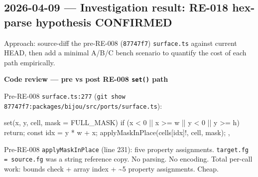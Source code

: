 \subsection{2026-04-09 --- Investigation result: RE-018 hex-parse hypothesis CONFIRMED}\label{record-422-investigation-result-re-018-hex-parse-hypothesis-confirmed}

Approach: source-diff the pre-RE-008 (\texttt{8\allowbreak{}7\allowbreak{}7\allowbreak{}4\allowbreak{}7\allowbreak{}f\allowbreak{}7}) \texttt{s\allowbreak{}u\allowbreak{}r\allowbreak{}f\allowbreak{}a\allowbreak{}c\allowbreak{}e\allowbreak{}.\allowbreak{}t\allowbreak{}s} against current HEAD, then add a minimal A/B/C bench scenario to quantify the cost of each path empirically.

\textbf{Code review --- pre vs post RE-008 \texttt{s\allowbreak{}e\allowbreak{}t\allowbreak{}(\allowbreak{})} path}

Pre-RE-008 \texttt{s\allowbreak{}u\allowbreak{}r\allowbreak{}f\allowbreak{}a\allowbreak{}c\allowbreak{}e\allowbreak{}.\allowbreak{}t\allowbreak{}s\allowbreak{}:\allowbreak{}2\allowbreak{}7\allowbreak{}7} (\texttt{g\allowbreak{}i\allowbreak{}t\allowbreak{} \allowbreak{}s\allowbreak{}h\allowbreak{}o\allowbreak{}w\allowbreak{} \allowbreak{}8\allowbreak{}7\allowbreak{}7\allowbreak{}4\allowbreak{}7\allowbreak{}f\allowbreak{}7\allowbreak{}:\allowbreak{}p\allowbreak{}a\allowbreak{}c\allowbreak{}k\allowbreak{}a\allowbreak{}g\allowbreak{}e\allowbreak{}s\allowbreak{}/\allowbreak{}b\allowbreak{}i\allowbreak{}j\allowbreak{}o\allowbreak{}u\allowbreak{}/\allowbreak{}s\allowbreak{}r\allowbreak{}c\allowbreak{}/\allowbreak{}p\allowbreak{}o\allowbreak{}r\allowbreak{}t\allowbreak{}s\allowbreak{}/\allowbreak{}s\allowbreak{}u\allowbreak{}r\allowbreak{}f\allowbreak{}a\allowbreak{}c\allowbreak{}e\allowbreak{}.\allowbreak{}t\allowbreak{}s}):

\begin{CodeBlock}
set(x, y, cell, mask = FULL_MASK) {
  if (x < 0 || x >= w || y < 0 || y >= h) return;
  const idx = y * w + x;
  applyMaskInPlace(cells[idx]!, cell, mask);
},
\end{CodeBlock}

Pre-RE-008 \texttt{a\allowbreak{}p\allowbreak{}p\allowbreak{}l\allowbreak{}y\allowbreak{}M\allowbreak{}a\allowbreak{}s\allowbreak{}k\allowbreak{}I\allowbreak{}n\allowbreak{}P\allowbreak{}l\allowbreak{}a\allowbreak{}c\allowbreak{}e} (line 231): five property assignments. \texttt{t\allowbreak{}a\allowbreak{}r\allowbreak{}g\allowbreak{}e\allowbreak{}t\allowbreak{}.\allowbreak{}f\allowbreak{}g\allowbreak{} \allowbreak{}=\allowbreak{} \allowbreak{}s\allowbreak{}o\allowbreak{}u\allowbreak{}r\allowbreak{}c\allowbreak{}e\allowbreak{}.\allowbreak{}f\allowbreak{}g} was a string reference copy. No parsing. No encoding. Total per-call work: bounds check + array index + \textasciitilde5 property assignments. Cheap.


